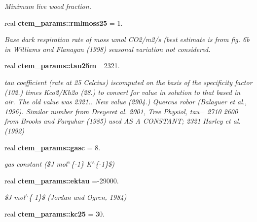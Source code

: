 \begin{DoxyCompactItemize}
\begin{DoxyCompactList}\small\item\em Minimum live wood fraction. \end{DoxyCompactList}\item 
\hypertarget{namespacectem__params_acedcadb21474712e7f4a90bfb98ee661}{}real {\bfseries ctem\+\_\+params\+::rmlmoss25} = 1.\label{namespacectem__params_acedcadb21474712e7f4a90bfb98ee661}

\begin{DoxyCompactList}\small\item\em Base dark respiration rate of moss umol C\+O2/m2/s (best estimate is from fig. 6b in Williams and Flanagan (1998) seasonal variation not considered. \end{DoxyCompactList}\item 
\hypertarget{namespacectem__params_a26fe22d544842a462db3a764fb43effd}{}real {\bfseries ctem\+\_\+params\+::tau25m} =2321.\label{namespacectem__params_a26fe22d544842a462db3a764fb43effd}

\begin{DoxyCompactList}\small\item\em tau coefficient (rate at 25 Celcius) iscomputed on the basis of the specificity factor (102.) times Kco2/\+Kh2o (28.) to convert for value in solution to that based in air. The old value was 2321.. New value (2904.) Quercus robor (Balaguer et al., 1996). Similar number from Dreyeret al. 2001, Tree Physiol, tau= 2710 2600 from Brooks and Farquhar (1985) used A\+S A C\+O\+N\+S\+T\+A\+N\+T; 2321 Harley et al. (1992) \end{DoxyCompactList}\item 
\hypertarget{namespacectem__params_a69dfc8466b8603dc7ce853efe2fbeb27}{}real {\bfseries ctem\+\_\+params\+::gasc} = 8.\label{namespacectem__params_a69dfc8466b8603dc7ce853efe2fbeb27}

\begin{DoxyCompactList}\small\item\em gas constant (\$\+J mol$^\wedge$\{-\/1\} K$^\wedge$\{-\/1\}\$) \end{DoxyCompactList}\item 
\hypertarget{namespacectem__params_ac7eca9b5a082ee77a63738607a2b453d}{}real {\bfseries ctem\+\_\+params\+::ektau} =-\/29000.\label{namespacectem__params_ac7eca9b5a082ee77a63738607a2b453d}

\begin{DoxyCompactList}\small\item\em \$\+J mol$^\wedge$\{-\/1\}\$ (Jordan and Ogren, 1984) \end{DoxyCompactList}\item 
\hypertarget{namespacectem__params_a4346f2333823e9b18ccb292128180726}{}real {\bfseries ctem\+\_\+params\+::kc25} = 30.\label{namespacectem__params_a4346f2333823e9b18ccb292128180726}


\end{DoxyCompactItemize}
